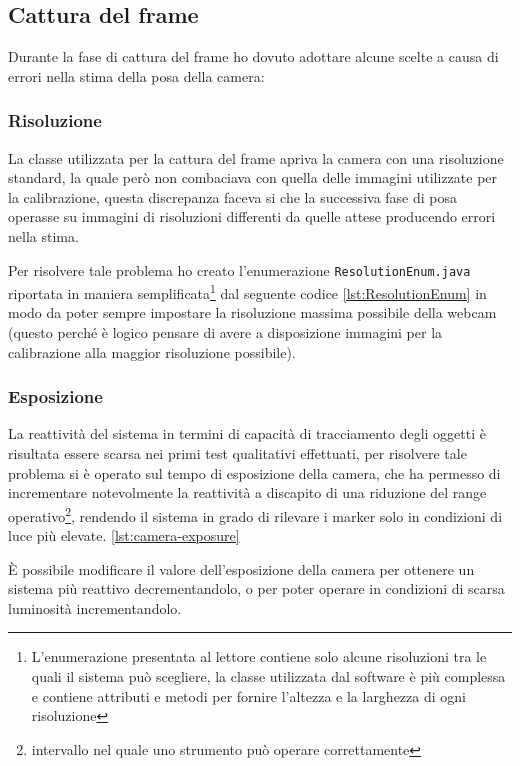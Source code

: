 \documentclass[12pt,a4paper,openright,twoside]{book}
\begin{document}
\subsection{Cattura del frame} \label{subsec:cattura_del_frame}
Durante la fase di cattura del frame ho dovuto adottare alcune scelte a causa di errori nella stima della posa della camera:
\subsubsection{Risoluzione}
La classe utilizzata per la cattura del frame apriva la camera con una risoluzione standard, la quale però non combaciava con quella delle immagini utilizzate per la calibrazione, questa discrepanza faceva si che la successiva fase di posa operasse su immagini di risoluzioni differenti da quelle attese producendo errori nella stima.

Per risolvere tale problema ho creato l'enumerazione \texttt{ResolutionEnum.java} riportata in maniera semplificata\footnote{L'enumerazione presentata al lettore contiene solo alcune risoluzioni tra le quali il sistema può scegliere, la classe utilizzata dal software è più complessa e contiene attributi e metodi per fornire l'altezza e la larghezza di ogni risoluzione} dal seguente codice \cref{lst:ResolutionEnum} in modo da poter sempre impostare la risoluzione massima possibile della webcam (questo perché è logico pensare di avere a disposizione immagini per la calibrazione alla maggior risoluzione possibile).

\subsubsection{Esposizione}
La reattività del sistema in termini di capacità di tracciamento degli oggetti è risultata essere scarsa nei primi test qualitativi effettuati, per risolvere tale problema si è operato sul tempo di esposizione della camera, che ha permesso di incrementare notevolmente la reattività a discapito di una riduzione del range operativo\footnote{intervallo nel quale uno strumento può operare correttamente}, rendendo il sistema in grado di rilevare i marker solo in condizioni di luce più elevate. \cref{lst:camera-exposure}


È possibile modificare il valore dell'esposizione della camera per ottenere un sistema più reattivo decrementandolo, o per poter operare in condizioni di scarsa luminosità incrementandolo.
\end{document}
